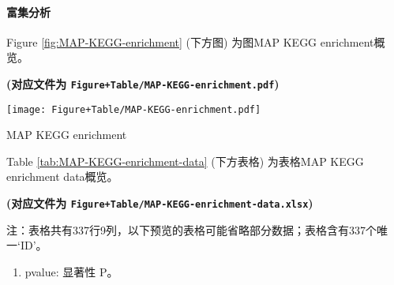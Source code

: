 \documentclass[
]{article}
\providecommand{\tightlist}{%
  \setlength{\itemsep}{0pt}\setlength{\parskip}{0pt}}
\begin{document}
\hypertarget{ux5bccux96c6ux5206ux6790}{%
\paragraph{富集分析}\label{ux5bccux96c6ux5206ux6790}}

Figure \ref{fig:MAP-KEGG-enrichment} (下方图) 为图MAP KEGG enrichment概览。

\textbf{(对应文件为 \texttt{Figure+Table/MAP-KEGG-enrichment.pdf})}

\def\@captype{figure}
\begin{center}
\texttt{[image: Figure+Table/MAP-KEGG-enrichment.pdf]}
\caption{MAP KEGG enrichment}\label{fig:MAP-KEGG-enrichment}
\end{center}

Table \ref{tab:MAP-KEGG-enrichment-data} (下方表格) 为表格MAP KEGG enrichment data概览。

\textbf{(对应文件为 \texttt{Figure+Table/MAP-KEGG-enrichment-data.xlsx})}

\begin{center}\begin{tcolorbox}[colback=gray!10, colframe=gray!50, width=0.9\linewidth, arc=1mm, boxrule=0.5pt]注：表格共有337行9列，以下预览的表格可能省略部分数据；表格含有337个唯一`ID'。
\end{tcolorbox}
\end{center}
\begin{center}\begin{tcolorbox}[colback=gray!10, colframe=gray!50, width=0.9\linewidth, arc=1mm, boxrule=0.5pt]\begin{enumerate}\tightlist
\item pvalue:  显著性 P。
\end{enumerate}\end{tcolorbox}
\end{center}
\end{document}
